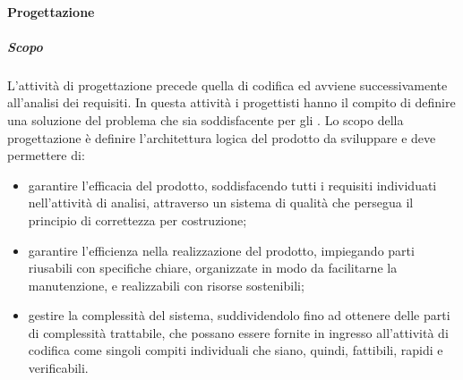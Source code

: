 			\paragraph {Progettazione}
				\subparagraph{Scopo}
					L'attività di progettazione precede quella di codifica ed avviene successivamente all'analisi dei requisiti.
					\newline
					In questa attività i progettisti hanno il compito di definire una soluzione del problema che sia soddisfacente per gli .
					\newline
					Lo scopo della progettazione è definire l'architettura logica del prodotto da sviluppare e deve permettere di:
					\begin{itemize}
						\item garantire l'efficacia del prodotto, soddisfacendo tutti i requisiti individuati nell'attività di analisi, attraverso un sistema di qualità che persegua il principio di correttezza per costruzione;
						\item garantire l'efficienza nella realizzazione del prodotto, impiegando parti riusabili con specifiche chiare, organizzate in modo da facilitarne la manutenzione, e realizzabili con risorse sostenibili;
						\item gestire la complessità del sistema, suddividendolo fino ad ottenere delle parti di complessità trattabile, che possano essere fornite in ingresso all'attività di codifica come singoli compiti individuali che siano, quindi, fattibili, rapidi e verificabili.
					\end{itemize}

